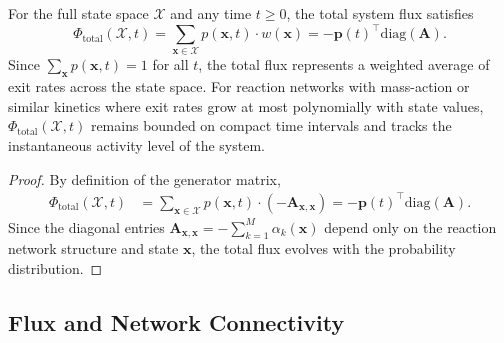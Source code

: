 \documentclass[review,onefignum,onetabnum]{siamart171218}
\begin{document}
\begin{proposition}
\label{prop:total-flux}
For the full state space $\mathcal{X}$ and any time $t \geq 0$, the total system flux satisfies
\begin{equation}
\Phi_{\mathrm{total}}(\mathcal{X},t) = \sum_{\boldsymbol{x} \in \mathcal{X}} p(\boldsymbol{x},t) \cdot w(\boldsymbol{x}) = -\boldsymbol{p}(t)^\top \mathrm{diag}(\mathbf{A}).
\end{equation}
Since $\sum_{\boldsymbol{x}} p(\boldsymbol{x},t) = 1$ for all $t$, the total flux represents a weighted average of exit rates across the state space. For reaction networks with mass-action or similar kinetics where exit rates grow at most polynomially with state values, $\Phi_{\mathrm{total}}(\mathcal{X},t)$ remains bounded on compact time intervals and tracks the instantaneous activity level of the system.
\end{proposition}

\begin{proof}
By definition of the generator matrix,
\begin{align}
\Phi_{\mathrm{total}}(\mathcal{X},t) &= \sum_{\boldsymbol{x} \in \mathcal{X}} p(\boldsymbol{x},t) \cdot (-\mathbf{A}_{\boldsymbol{x},\boldsymbol{x}}) = -\boldsymbol{p}(t)^\top \mathrm{diag}(\mathbf{A}).
\end{align}
Since the diagonal entries $\mathbf{A}_{\boldsymbol{x},\boldsymbol{x}} = -\sum_{k=1}^M \alpha_k(\boldsymbol{x})$ depend only on the reaction network structure and state $\boldsymbol{x}$, the total flux evolves with the probability distribution. 
\end{proof}

\subsection{Flux and Network Connectivity}
\label{sec:flux-connectivity}
\end{document}
